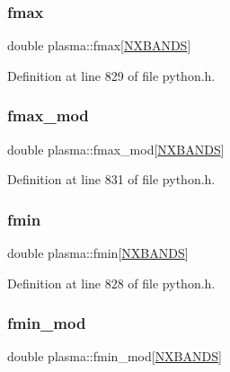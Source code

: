 \mbox{\label{structplasma_a21e7b17fa73a2521fe95247ac0d52d36}} 
\subsubsection{\texorpdfstring{fmax}{fmax}}
{\footnotesize\ttfamily double plasma\+::fmax\mbox{[}\hyperlink{python_8h_ac640b7fc429348ef2f6781704d3c5163}{N\+X\+B\+A\+N\+DS}\mbox{]}}



Definition at line 829 of file python.\+h.

\mbox{\label{structplasma_ab5b2a9cf34eb1359961d6783a81ea266}} 
\subsubsection{\texorpdfstring{fmax\+\_\+mod}{fmax\_mod}}
{\footnotesize\ttfamily double plasma\+::fmax\+\_\+mod\mbox{[}\hyperlink{python_8h_ac640b7fc429348ef2f6781704d3c5163}{N\+X\+B\+A\+N\+DS}\mbox{]}}



Definition at line 831 of file python.\+h.

\mbox{\label{structplasma_ac4d25da8ffad12c810a2be5baf12c9a0}} 
\subsubsection{\texorpdfstring{fmin}{fmin}}
{\footnotesize\ttfamily double plasma\+::fmin\mbox{[}\hyperlink{python_8h_ac640b7fc429348ef2f6781704d3c5163}{N\+X\+B\+A\+N\+DS}\mbox{]}}



Definition at line 828 of file python.\+h.

\mbox{\label{structplasma_a79f84fac2bd8b8ee286bf33092531f18}} 
\subsubsection{\texorpdfstring{fmin\+\_\+mod}{fmin\_mod}}
{\footnotesize\ttfamily double plasma\+::fmin\+\_\+mod\mbox{[}\hyperlink{python_8h_ac640b7fc429348ef2f6781704d3c5163}{N\+X\+B\+A\+N\+DS}\mbox{]}}



